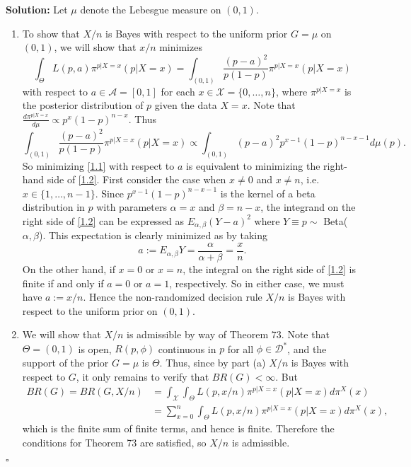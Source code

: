 \documentclass[12pt]{article}
\newcounter{ProofCounter}
\newenvironment{Solution}{\stepcounter{ProofCounter}\textbf{Solution:}}{\hfill$\square$}
\begin{document}
\begin{Solution}
  Let $\mu$ denote the Lebesgue measure on $(0,1)$.
  \begin{enumerate}[label=(\alph*), leftmargin=*]
    \item To show that $X / n$ is Bayes with respect to the uniform prior $G = \mu$ on $(0,1)$, we will show that $x / n$ minimizes
      \begin{equation}
        \int_{\Theta}L(p,a) \pi^{p|X=x}(p|X=x) = \int_{(0,1)} \frac{(p-a)^2}{p(1-p)}\pi^{p|X=x}(p|X=x)
        \label{1.1}
      \end{equation}
      with respect to $a \in \mathcal{A} = [0,1]$ for each $x \in \mathcal{X} = \{0, \dots, n\}$, where $\pi^{p|X=x}$ is the posterior distribution of
      $p$ given the data $X = x$. Note that $\frac{d\pi^{p|X=x}}{d\mu} \propto p^{x}(1-p)^{n-x}$. Thus
      \begin{equation}
        \int_{(0,1)} \frac{(p-a)^2}{p(1-p)}\pi^{p|X=x}(p|X=x) \propto \int_{(0,1)}(p-a)^2 p^{x-1}(1-p)^{n-x-1}d\mu(p).
        \label{1.2}
      \end{equation}
      So minimizing \eqref{1.1} with respect to $a$ is equivalent to minimizing the right-hand side of \eqref{1.2}.
      First consider the case when $x \neq 0$ and $x\neq n$, i.e. $x \in \{1, \dots, n-1\}$. Since $p^{x-1}(1-p)^{n-x-1}$ is the kernel of a beta
      distribution in $p$ with parameters $\alpha = x$ and $\beta = n-x$, the integrand on the right side of \eqref{1.2} can be expressed as 
      $E_{\alpha,\beta}(Y-a)^2$
      where $Y \equiv p \sim$ Beta($\alpha, \beta$). This expectation is clearly minimized as by taking 
      \[
        a := E_{\alpha,\beta}Y = \frac{\alpha}{\alpha + \beta} = \frac{x}{n}.
      \]
      On the other hand, if $x = 0$ or $x = n$, the integral on the right side of \eqref{1.2} is finite if and only if $a = 0$ or $a = 1$,
      respectively. So in either case, we must have $a := x / n$. Hence the non-randomized decision rule $X / n$ is Bayes with respect to the uniform
      prior on $(0,1)$.

    \item We will show that $X / n$ is admissible by way of Theorem 73. Note that $\Theta = (0,1)$ is open, $R(p, \phi)$ continuous in $p$ for all $\phi
      \in \mathcal{D}^*$, and the support of the prior $G = \mu$ is $\Theta$. Thus, since by part (a) $X / n$ is Bayes with respect to 
      $G$, it only remains to verify that $BR(G) < \infty$. But
      \begin{align*} 
        BR(G) = BR(G, X/n) & = \int_{\mathcal{X}} \int_{\Theta}L(p,x/n)\pi^{p|X=x}(p|X=x)d\pi^X(x) \\
        & = \sum_{x=0}^n\int_{\Theta}L(p,x/n)\pi^{p|X=x}(p|X=x)d\pi^X(x),
      \end{align*}
      which is the finite sum of finite terms, and hence is finite. Therefore the conditions for Theorem 73 are satisfied, so $X / n$ is admissible.


\end{enumerate}
\end{Solution}
\end{document}
